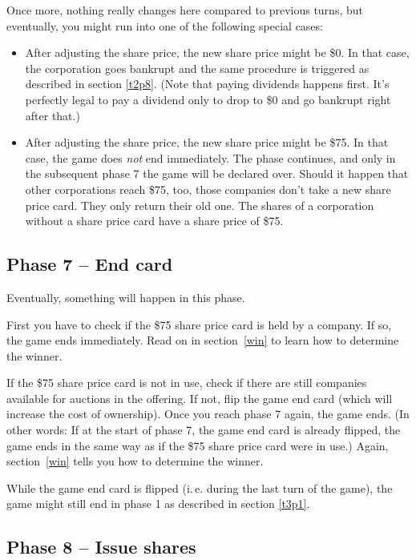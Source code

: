 \documentclass[10pt,final]{report}
\begin{document}
\begin{multicols}{2}
Once more, nothing really changes here compared to previous turns, but
eventually, you might run into one of the following special cases:
\begin{itemize}
\item After adjusting the share price, the new share price might be
  \$0. In that case, the corporation goes bankrupt and the same
  procedure is triggered as described in section \ref{t2p8}. (Note
  that paying dividends happens first. It's perfectly legal to pay a
  dividend only to drop to \$0 and go bankrupt right after that.)
\item After adjusting the share price, the new share price might be
  \$75. In that case, the game does \emph{not} end immediately. The
  phase continues, and only in the subsequent phase 7 the game will be
  declared over. Should it happen that other corporations reach \$75,
  too, those companies don't take a new share price card. They only
  return their old one. The shares of a corporation without a share
  price card have a share price of \$75.
\end{itemize}

\subsection{Phase 7 -- End card}
\label{t3p7}

Eventually, something will happen in this phase.

First you have to check if the \$75 share price card is held by a
company. If so, the game ends immediately. Read on in
section~\ref{win} to learn how to determine the winner.

If the \$75 share price card is not in use, check if there are still
companies available for auctions in the offering. If not, flip the
game end card (which will increase the cost of ownership). Once you
reach phase 7 again, the game ends. (In other words: If at the start
of phase 7, the game end card is already flipped, the game ends in the
same way as if the \$75 share price card were in use.) Again,
section~\ref{win} tells you how to determine the winner.

While the game end card is flipped (i.\,e. during the last turn of the
game), the game might still end in phase 1 as described in section
\ref{t3p1}.

\subsection{Phase 8 -- Issue shares}


\end{multicols}
\end{document}
